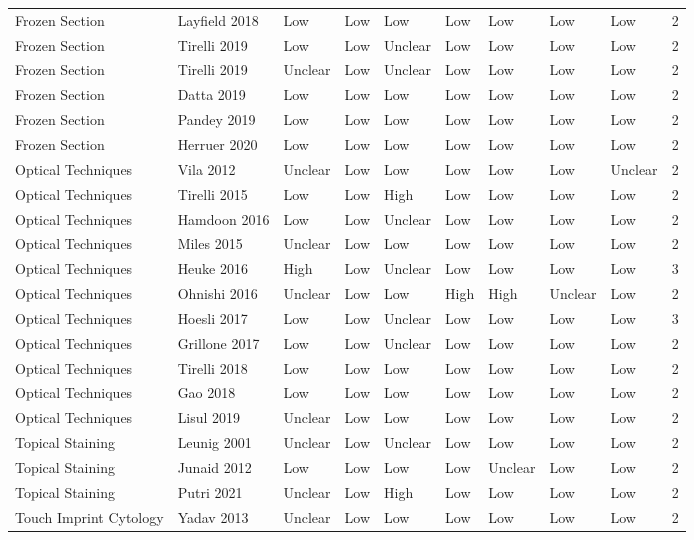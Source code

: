 \begin{table}[ht]
\begin{tabular}{llllllllll}
  Frozen Section & Layfield 2018 & Low & Low & Low & Low & Low & Low & Low & 2 \\ 
  Frozen Section & Tirelli 2019 & Low & Low & Unclear & Low & Low & Low & Low & 2 \\ 
  Frozen Section & Tirelli 2019 & Unclear & Low & Unclear & Low & Low & Low & Low & 2 \\ 
  Frozen Section & Datta 2019 & Low & Low & Low & Low & Low & Low & Low & 2 \\ 
  Frozen Section & Pandey 2019 & Low & Low & Low & Low & Low & Low & Low & 2 \\ 
  Frozen Section & Herruer 2020 & Low & Low & Low & Low & Low & Low & Low & 2 \\ 
  Optical Techniques & Vila 2012 & Unclear & Low & Low & Low & Low & Low & Unclear & 2 \\ 
  Optical Techniques & Tirelli 2015 & Low & Low & High & Low & Low & Low & Low & 2 \\ 
  Optical Techniques & Hamdoon 2016 & Low & Low & Unclear & Low & Low & Low & Low & 2 \\ 
  Optical Techniques & Miles 2015 & Unclear & Low & Low & Low & Low & Low & Low & 2 \\ 
  Optical Techniques & Heuke 2016 & High & Low & Unclear & Low & Low & Low & Low & 3 \\ 
  Optical Techniques & Ohnishi 2016 & Unclear & Low & Low & High & High & Unclear & Low & 2 \\ 
  Optical Techniques & Hoesli 2017 & Low & Low & Unclear & Low & Low & Low & Low & 3 \\ 
  Optical Techniques & Grillone 2017 & Low & Low & Unclear & Low & Low & Low & Low & 2 \\ 
  Optical Techniques & Tirelli 2018 & Low & Low & Low & Low & Low & Low & Low & 2 \\ 
  Optical Techniques & Gao 2018 & Low & Low & Low & Low & Low & Low & Low & 2 \\ 
  Optical Techniques & Lisul 2019 & Unclear & Low & Low & Low & Low & Low & Low & 2 \\ 
  Topical Staining & Leunig 2001 & Unclear & Low & Unclear & Low & Low & Low & Low & 2 \\ 
  Topical Staining & Junaid 2012 & Low & Low & Low & Low & Unclear & Low & Low & 2 \\ 
  Topical Staining & Putri 2021 & Unclear & Low & High & Low & Low & Low & Low & 2 \\ 
  Touch Imprint Cytology & Yadav 2013 & Unclear & Low & Low & Low & Low & Low & Low & 2 \\ 

\end{tabular}
\end{table}
